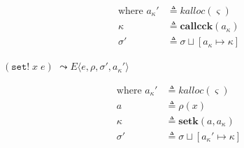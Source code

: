 \documentclass[12pt,draft]{article}
\newcommand{\setsyn}[2]{(\texttt{set!}\;#1\;#2)}
\newcommand{\env}[0]{\rho}
\newcommand{\store}[0]{\sigma}
\newcommand{\baddr}[0]{a}
\newcommand{\kaddr}[0]{a_{\kappa}}
\newcommand{\kont}[0]{\kappa}
\newcommand{\state}[0]{\varsigma}
\newcommand{\E}[4]{E\langle #1 , #2 , #3 , #4 \rangle}
\begin{document}
{\begin{multicols*}{2}
\vspace{-5mm}
\begin{align*}
  \text{where }
  \kaddr' &\triangleq kalloc(\state) \\
  \kont &\triangleq \textbf{callcck}(\kaddr) \\
  \store' &\triangleq \store \sqcup [\kaddr \mapsto \kont]
\end{align*}
\begin{center}
  $\setsyn{x}{e}$
  $\leadsto \E{e}{\env}{\store'}{\kaddr'}$
\end{center}
\vspace{-5mm}
\begin{align*}
  \text{where }
  \kaddr' &\triangleq kalloc(\state) \\
  \baddr &\triangleq \env(x) \\
  \kont &\triangleq \textbf{setk}(\baddr , \kaddr) \\
  \store' &\triangleq \store \sqcup [\kaddr' \mapsto \kont]
\end{align*}


\vfill\null
\columnbreak


\end{multicols*}}
\end{document}
